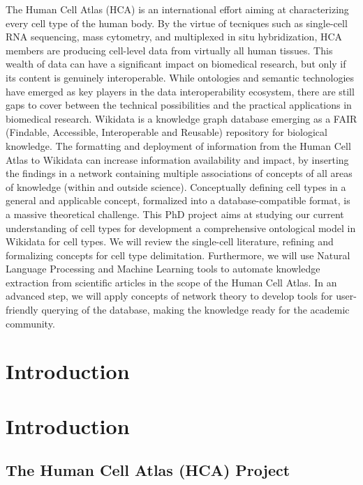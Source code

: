 The Human Cell Atlas (HCA) is an international effort aiming at characterizing every cell type of the human body.
By the virtue of tecniques such as single-cell RNA sequencing, mass cytometry, and multiplexed in situ hybridization, HCA members are producing cell-level data from virtually all human tissues.
This wealth of data can have a significant impact on biomedical research, but only if its content is genuinely interoperable.
While ontologies and semantic technologies have emerged as key players in the data interoperability ecosystem, there are still gaps to cover between the technical possibilities and the practical applications in biomedical research.
Wikidata is a knowledge graph database emerging as a FAIR (Findable, Accessible, Interoperable and Reusable) repository for biological knowledge.
The formatting and deployment of information from the Human Cell Atlas to Wikidata can increase information availability and impact, by inserting the findings in a network containing multiple associations of concepts of all areas of knowledge (within and outside science).
Conceptually defining cell types in a general and applicable concept, formalized into a database-compatible format, is a massive theoretical challenge.
This PhD project aims at studying our current understanding of cell types for development a comprehensive ontological model in Wikidata for cell types.
We will review the single-cell literature, refining and formalizing concepts for cell type delimitation. Furthermore, we will use Natural Language Processing and Machine Learning tools to automate knowledge extraction from scientific articles in the scope of the Human Cell Atlas.
In an advanced step, we will apply concepts of network theory to develop tools for user-friendly querying of the database, making the knowledge ready for the academic community.

\hypertarget{introduction}{%
\section{Introduction}\label{introduction}}

\hypertarget{introduction-1}{%
\section{Introduction}\label{introduction-1}}

\hypertarget{the-human-cell-atlas-hca-project}{%
\subsection{The Human Cell Atlas (HCA) Project}\label{the-human-cell-atlas-hca-project}}

